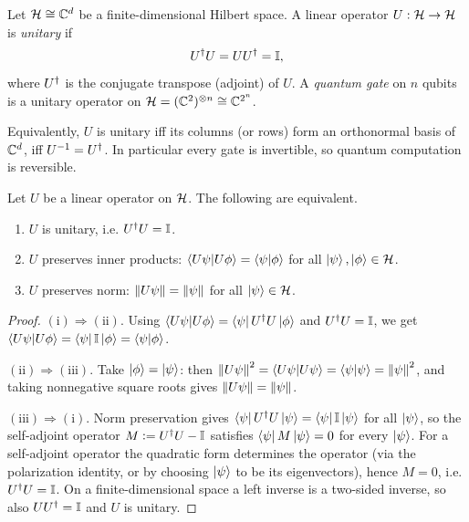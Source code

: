 \begin{definition}\label{def:lec01-unitary}
Let $\mathcal{H}\cong\mathbb{C}^{d}$ be a finite-dimensional Hilbert space. A linear operator
$U:\mathcal{H}\to\mathcal{H}$ is \emph{unitary} if
\[
  U^{\dagger} U = U U^{\dagger} = \mathbb{I},
\]
where $U^{\dagger}$ is the conjugate transpose (adjoint) of $U$. A \emph{quantum gate} on
$n$ qubits is a unitary operator on $\mathcal{H}=(\mathbb{C}^{2})^{\otimes n}\cong\mathbb{C}^{2^{n}}$.
\end{definition}

Equivalently, $U$ is unitary iff its columns (or rows) form an orthonormal basis of
$\mathbb{C}^{d}$, iff $U^{-1}=U^{\dagger}$. In particular every gate is invertible, so quantum
computation is reversible.

\begin{theorem}\label{thm:lec01-unitary-preserves}
Let $U$ be a linear operator on $\mathcal{H}$. The following are equivalent.
\begin{enumerate}[label=\textup{(\roman*)}]
  \item $U$ is unitary, i.e. $U^{\dagger} U=\mathbb{I}$.
  \item $U$ preserves inner products: $\braket{U\psi|U\phi}=\braket{\psi|\phi}$ for
        all $\ket{\psi},\ket{\phi}\in\mathcal{H}$.
  \item $U$ preserves norm: $\left\lVert U\psi \right\rVert=\left\lVert \psi \right\rVert$ for all $\ket{\psi}\in\mathcal{H}$.
\end{enumerate}
\end{theorem}

\begin{proof}
$(\mathrm{i})\Rightarrow(\mathrm{ii})$. Using
$\braket{U\psi|U\phi}=\bra{\psi}U^{\dagger} U\ket{\phi}$ and $U^{\dagger} U=\mathbb{I}$, we get
$\braket{U\psi|U\phi}=\bra{\psi}\mathbb{I}\ket{\phi}=\braket{\psi|\phi}$.

$(\mathrm{ii})\Rightarrow(\mathrm{iii})$. Take $\ket{\phi}=\ket{\psi}$: then
$\left\lVert U\psi \right\rVert^{2}=\braket{U\psi|U\psi}=\braket{\psi|\psi}=\left\lVert \psi \right\rVert^{2}$, and
taking nonnegative square roots gives $\left\lVert U\psi \right\rVert=\left\lVert \psi \right\rVert$.

$(\mathrm{iii})\Rightarrow(\mathrm{i})$. Norm preservation gives
$\bra{\psi}U^{\dagger} U\ket{\psi}=\bra{\psi}\mathbb{I}\ket{\psi}$ for all $\ket{\psi}$, so the
self-adjoint operator $M\vcentcolon= U^{\dagger} U-\mathbb{I}$ satisfies $\bra{\psi}M\ket{\psi}=0$ for
every $\ket{\psi}$. For a self-adjoint operator the quadratic form determines the
operator (via the polarization identity, or by choosing $\ket{\psi}$ to be its
eigenvectors), hence $M=0$, i.e. $U^{\dagger} U=\mathbb{I}$. On a finite-dimensional space a left
inverse is a two-sided inverse, so also $UU^{\dagger}=\mathbb{I}$ and $U$ is unitary.
\end{proof}


